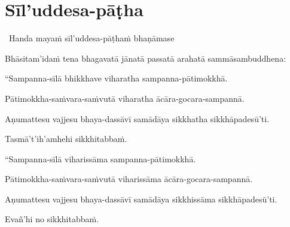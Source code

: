 
\section{Sīl'uddesa-pāṭha}
\label{siluddesa-patha}

\begin{intro}
	\anglebracketleft\ \hspace{-0.5mm}Handa mayaṁ sīl'uddesa-pāṭhaṁ bhaṇāmase \hspace{-0.5mm}\anglebracketright\
\end{intro}


\begin{hanging-indent}
Bhāsitam'idaṁ tena bhagavatā jānatā passatā arahatā sammāsambuddhena:
\end{hanging-indent}
\begin{hanging-indent-together}
``Sampanna-sīlā bhikkhave viharatha sampanna-pātimokkhā.
\end{hanging-indent-together}
\begin{hanging-indent-together}
Pātimokkha-saṁvara-saṁvutā viharatha ācāra-gocara-sampannā.
\end{hanging-indent-together}
\begin{hanging-indent-together}
Aṇumattesu vajjesu bhaya-dassāvī samādāya sikkhatha sikkhāpadesū'ti.
\end{hanging-indent-together}
\begin{hanging-indent-together}
Tasmā't'ih'amhehi sikkhitabbaṁ.
\end{hanging-indent-together}

\begin{hanging-indent}
``Sampanna-sīlā viharissāma sampanna-pātimokkhā.
\end{hanging-indent}
\begin{hanging-indent-together}
Pātimokkha-saṁvara-saṁvutā viharissāma ācāra-gocara-sampannā.
\end{hanging-indent-together}
\begin{hanging-indent-together}
Aṇumattesu vajjesu bhaya-dassāvī samādāya sikkhissāma sikkhāpadesū'ti.
\end{hanging-indent-together}
\begin{hanging-indent-together}
Evañ'hi no sikkhitabbaṁ.
\end{hanging-indent-together}

\suttaRef{[MN 6]}

\clearpage



